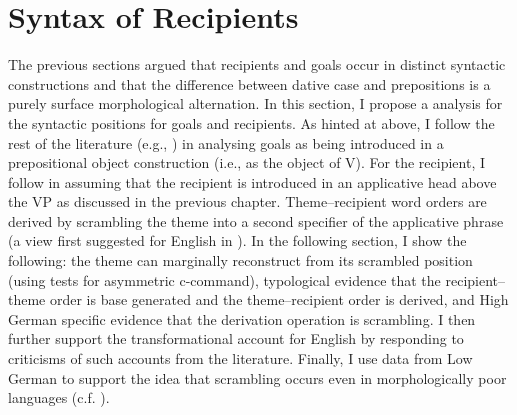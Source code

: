 \section{Syntax of Recipients}\label{sec:synrecp}
The previous sections argued that recipients and goals occur in distinct syntactic constructions and that the difference between dative case and prepositions is a purely surface morphological alternation. In this section, I propose a analysis for the syntactic positions for goals and recipients. As hinted at above, I follow the rest of the literature (e.g., \citet{Jackendoff.1990,Harley.2002,Hallman.2015}) in analysing goals as being introduced in a prepositional object construction (i.e., as the object of V). For the recipient, I follow \cite{McGinnis.1998,Bruening.2010,Bruening.2010b} in assuming that the recipient is introduced in an applicative head above the VP as discussed in the previous chapter. Theme--recipient word orders are derived by scrambling the theme into a second specifier of the applicative phrase (a view first suggested for English in \citet{Takano.1998}). In the following section, I show the following: the theme can marginally reconstruct from its scrambled position (using tests for asymmetric c-command), typological evidence that the recipient--theme order is base generated and the theme--recipient order is derived, and High German specific evidence that the derivation operation is scrambling. I then further support the transformational account for English by responding to criticisms of such accounts from the literature. Finally, I use data from Low German to support the idea that scrambling occurs even in morphologically poor languages (c.f. \citealt{Weerman.1997}). 
